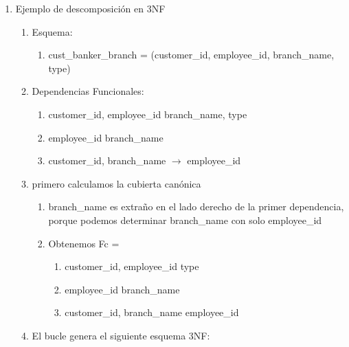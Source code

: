 \documentclass[twoside]{article}
\begin{document}
\begin{enumerate}
\begin{enumerate}
\begin{enumerate}
                        \end{enumerate}
            \end{enumerate}
      \item Ejemplo de descomposición en 3NF
            \begin{enumerate}
                  \item Esquema:
                        \begin{enumerate}
                              \item cust\_banker\_branch = (customer\_id, employee\_id, branch\_name, type)
                        \end{enumerate}
                  \item Dependencias Funcionales:
                        \begin{enumerate}
                              \item customer\_id, employee\_id  \rightarrow  branch\_name, type
                              \item employee\_id \rightarrow branch\_name
                              \item customer\_id, branch\_name $\rightarrow$ employee\_id
                        \end{enumerate}
                  \item primero calculamos la cubierta canónica
                        \begin{enumerate}
                              \item branch\_name es extraño en el lado derecho de la primer dependencia, porque podemos determinar branch\_name con solo employee\_id
                              \item Obtenemos Fc =
                                    \begin{enumerate}
                                          \item customer\_id, employee\_id \rightarrow type
                                          \item employee\_id \rightarrow branch\_name
                                          \item customer\_id, branch\_name \rightarrow employee\_id
                                    \end{enumerate}
                        \end{enumerate}
                  \item El bucle genera el siguiente esquema 3NF:
                        \begin{enumerate}

\end{enumerate}
\end{enumerate}
\end{enumerate}
\end{document}
